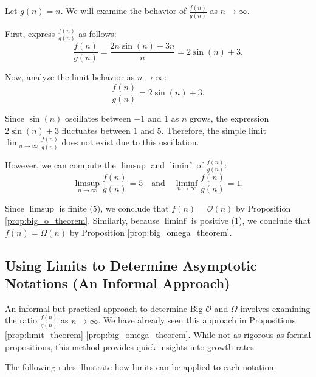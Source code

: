                 \begin{solution}
                Let \( g(n) = n \). We will examine the behavior of \( \frac{f(n)}{g(n)} \) as \( n \to \infty \).
                
                First, express \( \frac{f(n)}{g(n)} \) as follows:
                \[
                \frac{f(n)}{g(n)} = \frac{2n \sin(n) + 3n}{n} = 2 \sin(n) + 3.
                \]
                
                Now, analyze the limit behavior as \( n \to \infty \):
                \[
                \frac{f(n)}{g(n)} = 2 \sin(n) + 3.
                \]
                
                Since \( \sin(n) \) oscillates between \( -1 \) and \( 1 \) as \( n \) grows, the expression \( 2 \sin(n) + 3 \) fluctuates between \( 1 \) and \( 5 \). Therefore, the simple limit \( \lim_{n \to \infty} \frac{f(n)}{g(n)} \) does not exist due to this oscillation.
                
                However, we can compute the \(\limsup\) and \(\liminf\) of \( \frac{f(n)}{g(n)} \):
                \[
                \limsup_{n \to \infty} \frac{f(n)}{g(n)} = 5 \quad \text{and} \quad \liminf_{n \to \infty} \frac{f(n)}{g(n)} = 1.
                \]
                
                Since \(\limsup\) is finite (\(5\)), we conclude that \( f(n) = \mathcal{O}(n) \) by Proposition \ref{prop:big_o_theorem}. Similarly, because \(\liminf\) is positive (\(1\)), we conclude that \( f(n) = \Omega(n) \) by Proposition \ref{prop:big_omega_theorem}.
                \end{solution}
                
                
                

        \subsection*{Using Limits to Determine Asymptotic Notations (An Informal Approach)}

        An informal but practical approach to determine Big-$\mathcal{O}$ and $\Omega$ involves examining the ratio \( \frac{f(n)}{g(n)} \) as \( n \to \infty \). We have already seen this approach in Propositions \ref{prop:limit_theorem}-\ref{prop:big_omega_theorem}. While not as rigorous as formal propositions, this method provides quick insights into growth rates.
        
        The following rules illustrate how limits can be applied to each notation:
       

